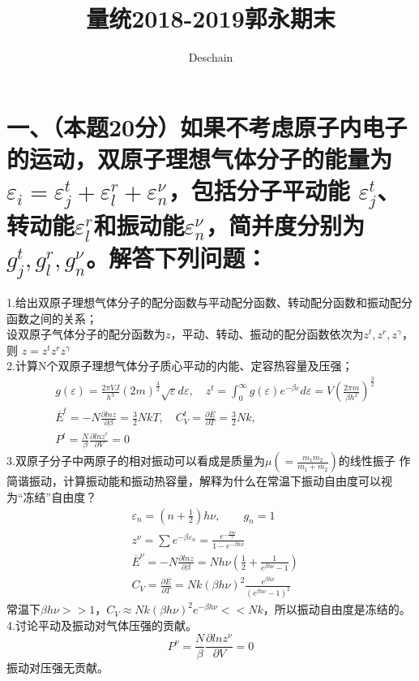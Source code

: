\documentclass[UTF8]{ctexart}
\title{量统2018-2019郭永期末}
\author{Deschain}
\begin{document}
\maketitle
\section*{一、（本题20分）如果不考虑原子内电子的运动，双原子理想气体分子的能量为
  $\varepsilon_i=\varepsilon_j^t+\varepsilon_l^r+\varepsilon_n^\nu$，包括分子平动能
  $\varepsilon_j^t$、转动能$\varepsilon_l^r$和振动能$\varepsilon_n^\nu$，简并度分别为
  $g_j^t,g_l^r,g_n^\nu$。解答下列问题：}
1.给出双原子理想气体分子的配分函数与平动配分函数、转动配分函数和振动配分函数之间的关系；\\
设双原子气体分子的配分函数为$z$，平动、转动、振动的配分函数依次为$z^t,z^r,z^\gamma$，则
$z=z^tz^rz^\gamma$\\
2.计算N个双原子理想气体分子质心平动的内能、定容热容量及压强；
\begin{equation*}
  \begin{aligned}
     & g(\varepsilon)=\frac{2\pi VJ}{h^3}(2m)^\frac{3}{2}\sqrt{\varepsilon}d\varepsilon,\quad
    z^t=\int_0^\infty g(\varepsilon)e^{-\beta\varepsilon}d\varepsilon
    =V(\frac{2\pi m}{\beta h^2})^\frac{3}{2}                                                  \\
     & \overline{E}^t=-N\frac{\partial lnz}{\partial\beta}=\frac{3}{2}NkT,\quad
    C_V^t=\frac{\partial\overline{E}}{\partial T}=\frac{3}{2}Nk,\quad                         \\
     & P^t=\frac{N}{\beta}\frac{\partial lnz^r}{\partial V}=0
  \end{aligned}
\end{equation*}
3.双原子分子中两原子的相对振动可以看成是质量为$\mu(=\frac{m_1m_2}{m_1+m_2})$的线性振子
作简谐振动，计算振动能和振动热容量，解释为什么在常温下振动自由度可以视为“冻结”自由度？
\begin{equation*}
  \begin{aligned}
     & \varepsilon_n=(n+\frac{1}{2})h\nu,\quad\quad g_n=1    \\
     & z^\nu=\sum e^{-\beta\varepsilon_n}
    =\frac{e^{-\frac{\beta h\nu}{2}}}{1-e^{-\beta h\nu}}     \\
     & \overline{E}^\nu=-N\frac{\partial lnz}{\partial\beta}
    =Nh\nu(\frac{1}{2}+\frac{1}{e^{\beta h\nu}-1})           \\
     & C_V=\frac{\partial\overline{E}}{\partial T}
    =Nk(\beta h\nu)^2\frac{e^{\beta h\nu}}{(e^{\beta h\nu}-1)^2}
  \end{aligned}
\end{equation*}
常温下$\beta h\nu>>1$，$C_V\approx Nk(\beta h\nu)^2e^{-\beta h\nu}<<Nk$，所以振动自由度是冻结的。\\
4.讨论平动及振动对气体压强的贡献。
\begin{equation*}
  P^\nu=\frac{N}{\beta}\frac{\partial lnz^\nu}{\partial V}=0
\end{equation*}
振动对压强无贡献。
\end{document}
